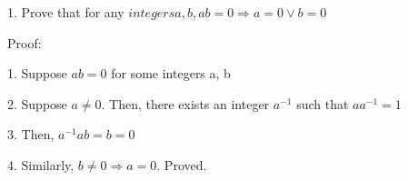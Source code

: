 \documentclass{article}
\begin{document}
1. Prove that for any  $ integers a, b, ab = 0 \Rightarrow a = 0 \lor b = 0 $

Proof:

1. Suppose $ ab = 0 $ for some integers a, b

2. Suppose $ a \neq 0. $ Then, there exists an integer $ a^{-1} $ such that $
aa^{-1} = 1 $

3. Then, $a^{-1} a b = b = 0 $

4. Similarly, $ b \neq 0 \Rightarrow a = 0 $. Proved.
\end{document}
